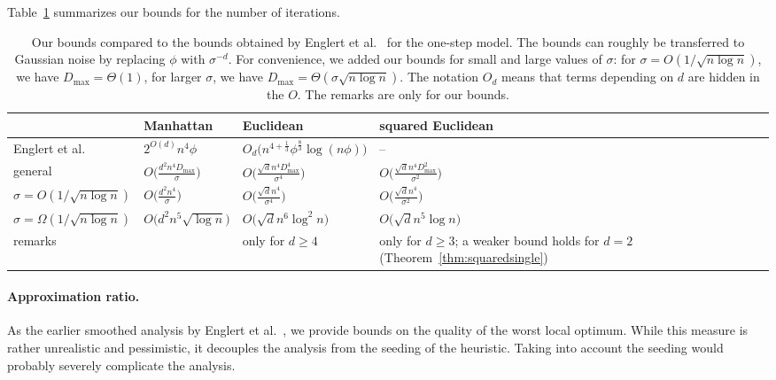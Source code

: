 \documentclass[11pt,DIV=12,a4paper]{scrartcl}
\newcommand{\maxx}{D_{\max}}
\begin{document}
Table~\ref{tab:results} summarizes our bounds for the number of iterations.

\begin{table}[t]
\centering
\begin{tabularx}{\textwidth}{@{}lllX@{}} \toprule
& Manhattan & Euclidean & squared Euclidean \\ \midrule
Englert et al.~\cite{EnglertEA:2Opt:2014} & $ 2^{O(d)} n^4 \phi$ & $O_d\bigl(n^{4 + \frac 13} \phi^{\frac 83} \log(n\phi)\bigr)$ & -- \\ \midrule
general & $O\bigl(\frac{d^2 n^4 \maxx}{\sigma}\bigr)$ 
& $O\bigl(\frac{\sqrt d n^4 \maxx^4}{\sigma^4}\bigr)$& $O\bigl(\frac{\sqrt d n^4\maxx^2}{\sigma^2}\bigr)$  \\[\smallskipamount]
$\sigma = O(1/\sqrt{n \log n})$ &$O\bigl(\frac{d^2 n^4}{\sigma}\bigr)$ 
& $O\bigl(\frac{\sqrt d n^4}{\sigma^4}\bigr)$ & $O\bigl(\frac{\sqrt d n^4}{\sigma^2}\bigr)$ \\[\smallskipamount]
$\sigma = \Omega(1/\sqrt{n \log n})$ &$O\bigl(d^2 n^5 \sqrt{\log n}\bigr)$ 
& $O\bigl(\sqrt d n^6 \log^2 n\bigr)$ & $O\bigl(\sqrt d n^5 \log n\bigr)$ \\
remarks & & only for $d \geq 4$ & only for $d \geq 3$; a weaker bound holds for $d=2$ (Theorem~\ref{thm:squaredsingle}) \\ \bottomrule
\end{tabularx}
\caption{Our bounds compared to the bounds obtained by Englert et al.~\cite{EnglertEA:2Opt:2014} for the one-step model.
The bounds can roughly be transferred to Gaussian noise by replacing $\phi$ with $\sigma^{-d}$.
For convenience, we added our bounds for small and large values of $\sigma$: for $\sigma = O(1/\sqrt{n \log n})$,
we have $\maxx = \Theta(1)$, for larger $\sigma$, we have $\maxx = \Theta(\sigma \sqrt{n \log n})$. The notation $O_d$ means that
terms depending on $d$ are hidden in the $O$. The remarks are only for our bounds.}
\label{tab:results}
\end{table}


\paragraph{Approximation ratio.}

As the earlier smoothed analysis by Englert et al.~\cite{EnglertEA:2Opt:2014}, we provide bounds on the quality of the worst local optimum.
While this measure is rather unrealistic and pessimistic, it decouples the analysis from the seeding of the heuristic. Taking
into account the seeding would probably severely complicate the analysis.
\end{document}

